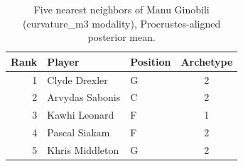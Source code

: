 \begin{table}[htbp]
  \centering\small
  \begin{tabular}{rllc}
    \toprule
    Rank & Player & Position & Archetype \\
    \midrule
    1 & Clyde Drexler & G & 2 \\
    2 & Arvydas Sabonis & C & 2 \\
    3 & Kawhi Leonard & F & 1 \\
    4 & Pascal Siakam & F & 2 \\
    5 & Khris Middleton & G & 2 \\
    \bottomrule
  \end{tabular}
  \caption{Five nearest neighbors of Manu Ginobili (curvature_m3 modality), Procrustes-aligned posterior mean.}
  \label{tab:Manu_Ginobili_neighbors_curvature_m3}
\end{table}

